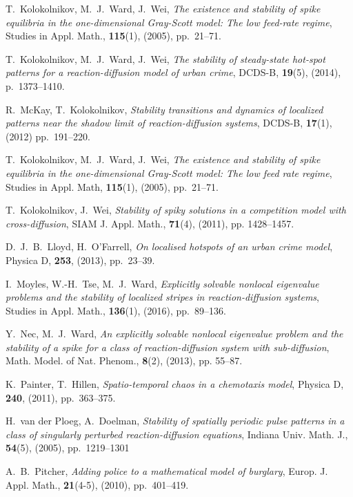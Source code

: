 \documentclass{article}%
\begin{document}
\begin{thebibliography}{99}
 T.~Kolokolnikov, M.~J.~Ward, J.~Wei, \textit{The
  existence and stability of spike equilibria in the one-dimensional
  Gray-Scott model: The low feed-rate regime}, Studies in Appl. Math.,
  \textbf{115}(1), (2005), pp.~21--71.

 T.~Kolokolnikov, M.~J.~Ward, J.~Wei, \textit{The
  stability of steady-state hot-spot patterns for a reaction-diffusion
  model of urban crime}, DCDS-B, \textbf{19}(5), (2014),
  p.~1373--1410.

 R.~McKay, T.~Kolokolnikov, \textit{Stability
  transitions and dynamics of localized patterns near the shadow limit
  of reaction-diffusion systems}, DCDS-B, \textbf{17}(1), (2012)
  pp.~191--220.

 T.~Kolokolnikov, M.~J.~Ward, J.~Wei, \textit{The 
   existence and stability of spike equilibria in the one-dimensional 
   Gray-Scott model: The low feed rate regime}, Studies in Appl.
   Math, \textbf{115}(1), (2005), pp.~21--71.

 T.~Kolokolnikov, J.~Wei, \textit{Stability
of spiky solutions in a competition model with cross-diffusion}, SIAM
J. Appl. Math., \textbf{71}(4), (2011), pp. 1428--1457.

 D.~J.~B.~Lloyd, H.~O'Farrell, \textit{On
  localised hotspots of an urban crime model}, Physica D,
  \textbf{253}, (2013), pp.~23--39.

 I.~Moyles, W.-H.~Tse, M.~J.~Ward,
  \textit{Explicitly solvable nonlocal eigenvalue problems and the
    stability of localized stripes in reaction-diffusion systems},
  Studies in Appl. Math., \textbf{136}(1), (2016), pp.~89--136.

 Y.~Nec, M.~J.~Ward, \textit{An explicitly solvable
nonlocal eigenvalue problem and the stability of a spike for a class
of reaction-diffusion system with sub-diffusion}, Math. Model. of
Nat. Phenom., \textbf{8}(2), (2013), pp. 55--87.

 K.~Painter, T.~Hillen,
  \textit{Spatio-temporal chaos in a chemotaxis model}, Physica D,
  \textbf{240}, (2011), pp.~363--375.

 H.~van der Ploeg, A.~Doelman, \textit{
  Stability of spatially periodic pulse patterns in a class of
  singularly perturbed reaction-diffusion equations}, Indiana
  Univ. Math. J., \textbf{54}(5), (2005), pp.~1219--1301

 A.~B.~Pitcher, \textit{Adding police to a
  mathematical model of burglary}, Europ. J. Appl. Math.,
  \textbf{21}(4-5), (2010), pp.~401--419.


\end{thebibliography}
\end{document}

